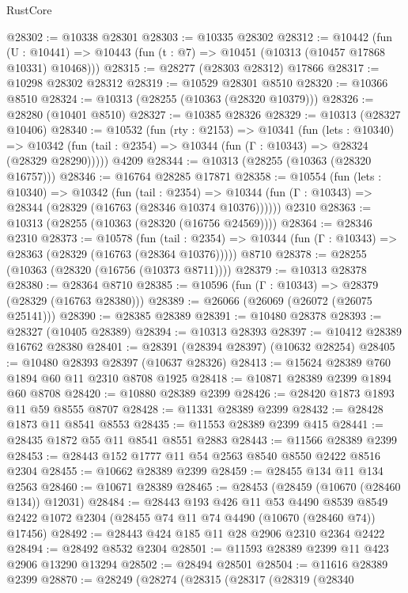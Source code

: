 \begin{lexlean}{RustCore}
\begin{coremodule}
@28302 := @10338 @28301
@28303 := @10335 @28302
@28312 := @10442
    (fun (U : @10441) => @10443 (fun (t : @7) => @10451 (@10313 (@10457 @17868 @10331) @10468)))
@28315 := @28277 (@28303 @28312) @17866
@28317 := @10298 @28302 @28312
@28319 := @10529 @28301 @8510
@28320 := @10366 @8510
@28324 := @10313 (@28255 (@10363 (@28320 @10379)))
@28326 := @28280 (@10401 @8510)
@28327 := @10385 @28326
@28329 := @10313 (@28327 @10406)
@28340 := @10532
    (fun (rty : @2153) =>
    @10341
      (fun (lets : @10340) =>
      @10342 (fun (tail : @2354) => @10344 (fun (Γ : @10343) => @28324 (@28329 @28290)))))
    @4209
@28344 := @10313 (@28255 (@10363 (@28320 @16757)))
@28346 := @16764 @28285 @17871
@28358 := @10554
    (fun (lets : @10340) =>
    @10342
      (fun (tail : @2354) =>
      @10344 (fun (Γ : @10343) => @28344 (@28329 (@16763 (@28346 @10374 @10376))))))
    @2310
@28363 := @10313 (@28255 (@10363 (@28320 (@16756 @24569))))
@28364 := @28346 @2310
@28373 := @10578
    (fun (tail : @2354) => @10344 (fun (Γ : @10343) => @28363 (@28329 (@16763 (@28364 @10376)))))
    @8710
@28378 := @28255 (@10363 (@28320 (@16756 (@10373 @8711))))
@28379 := @10313 @28378
@28380 := @28364 @8710
@28385 := @10596 (fun (Γ : @10343) => @28379 (@28329 (@16763 @28380)))
@28389 := @26066 (@26069 (@26072 (@26075 @25141)))
@28390 := @28385 @28389
@28391 := @10480 @28378
@28393 := @28327 (@10405 @28389)
@28394 := @10313 @28393
@28397 := @10412 @28389 @16762 @28380
@28401 := @28391 (@28394 @28397) (@10632 @28254)
@28405 := @10480 @28393 @28397 (@10637 @28326)
@28413 := @15624 @28389 @760 @1894 @60 @11 @2310 @8708 @1925
@28418 := @10871 @28389 @2399 @1894 @60 @8708
@28420 := @10880 @28389 @2399
@28426 := @28420 @1873 @1893 @11 @59 @8555 @8707
@28428 := @11331 @28389 @2399
@28432 := @28428 @1873 @11 @8541 @8553
@28435 := @11553 @28389 @2399 @415
@28441 := @28435 @1872 @55 @11 @8541 @8551 @2883
@28443 := @11566 @28389 @2399
@28453 := @28443 @152 @1777 @11 @54 @2563 @8540 @8550 @2422 @8516 @2304
@28455 := @10662 @28389 @2399
@28459 := @28455 @134 @11 @134 @2563
@28460 := @10671 @28389
@28465 := @28453 (@28459 (@10670 (@28460 @134)) @12031)
@28484 := @28443
    @193
    @426
    @11
    @53
    @4490
    @8539
    @8549
    @2422
    @1072
    @2304
    (@28455 @74 @11 @74 @4490 (@10670 (@28460 @74)) @17456)
@28492 := @28443 @424 @185 @11 @28 @2906 @2310 @2364 @2422
@28494 := @28492 @8532 @2304
@28501 := @11593 @28389 @2399 @11 @423 @2906 @13290 @13294
@28502 := @28494 @28501
@28504 := @11616 @28389 @2399
@28870 := @28249
    (@28274
      (@28315
        (@28317
          (@28319
            (@28340

\end{coremodule}
\end{lexlean}
